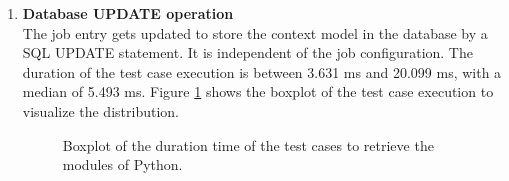 \documentclass[draft,final]{vutinfth} %
\begin{document}
\begin{enumerate}
	\item \textbf{Database UPDATE operation} \\
	The job entry gets updated to store the context model in the database by a SQL UPDATE statement. It is independent of the job configuration. The duration of the test case execution is between 3.631 ms and 20.099 ms, with a median of 5.493 ms. Figure \ref{fig:evaluation_perf_database} shows the boxplot of the test case execution to visualize the distribution. 
	
	\begin{figure}[!h]
		\centering
		\caption{Boxplot of the duration time of the test cases to retrieve the modules of Python.}
		\label{fig:evaluation_perf_database}		
	\end{figure}
	
\end{enumerate}
\end{document}
